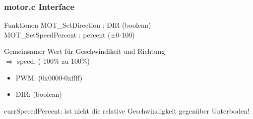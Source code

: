 \documentclass[usenames, dvipsnames]{beamer}
\begin{document}
\begin{frame}
		\frametitle{motor.c Interface}
		
		\begin{block}{Funktionen}
			MOT\_SetDirection : DIR (boolean)\\
			MOT\_SetSpeedPercent : percent ($\pm$0-100) %
		\end{block}

		\begin{block}{}
			Gemeinsamer Wert für Geschwindikeit und Richtung\\ $\Rightarrow$ speed: (-100\% zu 100\%)
			\begin{itemize}
				\item{PWM: (0x0000-0xffff)}
				\item{DIR: (boolean)}
			\end{itemize}
		\end{block}

		\begin{alertblock}{}
			currSpeeedPercent: ist nicht die relative Geschwindigkeit gegenüber Unterboden!
		\end{alertblock}
\end{frame}
\end{document}
